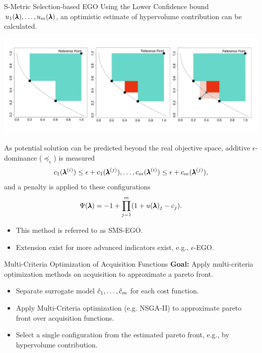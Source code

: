 \begin{frame}[allowframebreaks]{S-Metric Selection-based EGO}
    Using the Lower Confidence bound $u_1(\pmb{\lambda}), \dots, u_m(\pmb{\lambda})$, an optimistic estimate of hypervolume contribution can be calculated.

    \begin{center}
        \includegraphics[scale=0.35]{images/hv_contribution_2}
    \end{center}

    \framebreak

    As potential solution can be predicted beyond the real objective space, additive $\epsilon$-dominance ($\preceq_\epsilon$) is measured
            $$
                c_1(\pmb{\lambda}^{(i)}) \le \epsilon+c_1(\pmb{\lambda}^{(j)}), \dots, c_m(\pmb{\lambda}^{(i)}) \le \epsilon+c_m(\pmb{\lambda}^{(j)}),
            $$
            and a penalty is applied to these configurations
            $$
                \Psi(\pmb{\lambda}) = -1 + \prod_{j=1}^m(1+u(\pmb{\lambda})_j - c_j).
            $$

    \begin{itemize}
        \item This method is referred to as SMS-EGO.
        \item Extension exist for more advanced indicators exist, e.g., $\epsilon$-EGO.
    \end{itemize}
\end{frame}


\begin{frame}{Multi-Criteria Optimization of Acquisition Functions}
    \textbf{Goal:} Apply multi-criteria optimization methods on acquisition to approximate a pareto front.

    \begin{itemize}
       \item Separate surrogate model $\hat{c}_1, \dots, \hat{c}_m$ for each cost function.
       \item Apply Multi-Criteria optimization (e.g. NSGA-II) to approximate pareto front over acquisition functions.
       \item Select a single configuration from the estimated pareto front, e.g., by hypervolume contribution.
    \end{itemize}
\end{frame}



